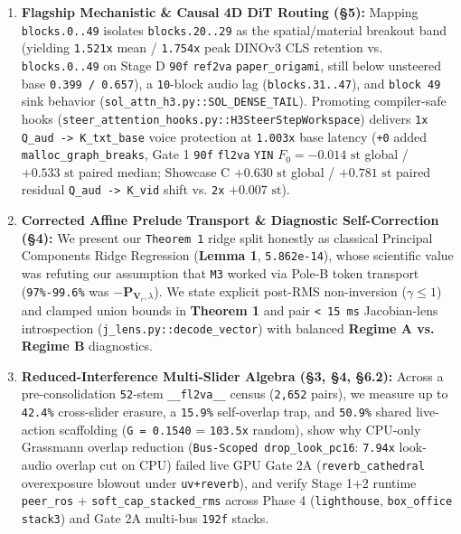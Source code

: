 \documentclass[10pt]{article}
\begin{document}
\begin{enumerate}[leftmargin=*]
\item \textbf{Flagship Mechanistic \& Causal 4D DiT Routing (\S{}5):} Mapping \texttt{blocks.0..49} isolates \texttt{blocks.20..29} as the spatial/material breakout band (yielding \texttt{1.521x} mean / \texttt{1.754x} peak DINOv3 CLS retention vs. \texttt{blocks.0..49} on Stage D \texttt{90f} \texttt{ref2va} \texttt{paper\_origami}, still below unsteered base \texttt{0.399 / 0.657}), a \texttt{10}-block audio lag (\texttt{blocks.31..47}), and \texttt{block 49} sink behavior (\texttt{sol\_attn\_h3.py::SOL\_DENSE\_TAIL}). Promoting compiler-safe hooks (\texttt{steer\_attention\_hooks.py::H3SteerStepWorkspace}) delivers \texttt{1x Q\_aud -> K\_txt\_base} voice protection at \texttt{1.003x} base latency (\texttt{+0} added \texttt{malloc\_graph\_breaks}, Gate 1 \texttt{90f} \texttt{fl2va} \texttt{YIN} $F_0 = -0.014\text{ st}$ global / $+0.533\text{ st}$ paired median; Showcase C $+0.630\text{ st}$ global / $+0.781\text{ st}$ paired residual \texttt{Q\_aud -> K\_vid} shift vs. \texttt{2x} $+0.007\text{ st}$).
\item \textbf{Corrected Affine Prelude Transport \& Diagnostic Self-Correction (\S{}4):} We present our \texttt{Theorem 1} ridge split honestly as classical Principal Components Ridge Regression (\textbf{Lemma 1}, \texttt{5.862e-14}), whose scientific value was refuting our assumption that \texttt{M3} worked via Pole-B token transport (\texttt{97\%-99.6\%} was $-\mathbf{P}_{\mathbf{V}_r,\lambda}$). We state explicit post-RMS non-inversion ($\gamma \le 1$) and clamped union bounds in \textbf{Theorem 1} and pair \texttt{< 15 ms} Jacobian-lens introspection (\texttt{j\_lens.py::decode\_vector}) with balanced \textbf{Regime A vs. Regime B} diagnostics.
\item \textbf{Reduced-Interference Multi-Slider Algebra (\S{}3, \S{}4, \S{}6.2):} Across a pre-consolidation \texttt{52}-stem \texttt{\_\_fl2va\_\_} census (\texttt{2,652} pairs), we measure up to \texttt{42.4\%} cross-slider erasure, a \texttt{15.9\%} self-overlap trap, and \texttt{50.9\%} shared live-action scaffolding (\texttt{G = 0.1540} = \texttt{103.5x} random), show why CPU-only Grassmann overlap reduction (\texttt{Bus-Scoped drop\_look\_pc16}: \texttt{7.94x} look-audio overlap cut on CPU) failed live GPU Gate 2A (\texttt{reverb\_cathedral} overexposure blowout under \texttt{uv+reverb}), and verify Stage 1+2 runtime \texttt{peer\_ros} + \texttt{soft\_cap\_stacked\_rms} across Phase 4 (\texttt{lighthouse}, \texttt{box\_office} \texttt{stack3}) and Gate 2A multi-bus \texttt{192f} stacks.

\end{enumerate}
\end{document}
